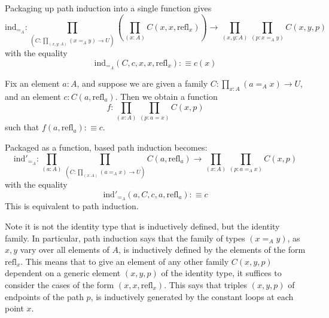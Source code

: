 Packaging up path induction into a single function gives \begin{equation*}
    \text{ind}_{=_A}:\prod_{(C:\prod_{(x,y:A)}(x=_Ay)\rightarrow U)}\left(\prod_{(x:A)}C(x,x,\text{refl}_x)\right)\rightarrow \prod_{(x,y:A)}\prod_{(p:x=_Ay)}C(x,y,p)
\end{equation*}
with the equality \begin{equation*}
    \text{ind}_{=_A}(C,c,x,x,\text{refl}_x) :\equiv c(x)
\end{equation*}

\begin{theorem}
    Fix an element $a:A$, and suppose we are given a family $C:\prod_{x:A}(a=_Ax)\rightarrow U$, and an element $c:C(a,\text{refl}_a)$. Then we obtain a function $$f:\prod_{(x:A)}\prod_{(p:a=x)}C(x,p)$$
    such that $f(a,\text{refl}_a) :\equiv c$.
\end{theorem}

Packaged as a function, based path induction becomes: \begin{equation*}
    \text{ind}'_{=_A}:\prod_{(a:A)}\prod_{(C:\prod_{(x:A)}(a=_Ax)\rightarrow U)}C(a,\text{refl}_a)\rightarrow \prod_{(x:A)}\prod_{(p:a=_Ax)}C(x,p)
\end{equation*}
with the equality $$\text{ind}'_{=_A}(a,C,c,a,\text{refl}_a) :\equiv c$$
This is equivalent to path induction. 


\begin{remark}
    Note it is not the identity type that is inductively defined, but the identity family. In particular, path induction says that the family of types $(x=_Ay)$, as $x,y$ vary over all elements of $A$, is inductively defined by the elements of the form $\text{refl}_x$. This means that to give an element of any other family $C(x,y,p)$ dependent on a generic element $(x,y,p)$ of the identity type, it suffices to consider the cases of the form $(x,x,\text{refl}_x)$. This says that triples $(x,y,p)$ of endpoints of the path $p$, is inductively generated by the constant loops at each point $x$.
\end{remark}


